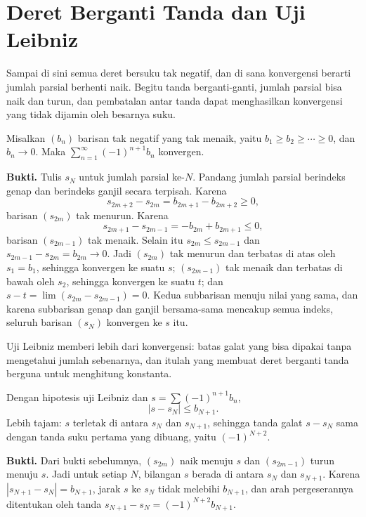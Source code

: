 \section{Deret Berganti Tanda dan Uji Leibniz}

Sampai di sini semua deret bersuku tak negatif, dan di sana konvergensi berarti
jumlah parsial berhenti naik. Begitu tanda berganti-ganti, jumlah parsial bisa naik
dan turun, dan pembatalan antar tanda dapat menghasilkan konvergensi yang tidak
dijamin oleh besarnya suku.

\begin{teorema}
Misalkan $(b_n)$ barisan tak negatif yang tak menaik, yaitu $b_1 \ge b_2 \ge \cdots
\ge 0$, dan $b_n \to 0$. Maka $\sum_{n=1}^{\infty} (-1)^{n+1} b_n$ konvergen.
\end{teorema}

\noindent\textbf{Bukti.} Tulis $s_N$ untuk jumlah parsial ke-$N$. Pandang jumlah parsial berindeks genap dan
berindeks ganjil secara terpisah. Karena
\[
  s_{2m+2} - s_{2m} = b_{2m+1} - b_{2m+2} \ge 0,
\]
barisan $(s_{2m})$ tak menurun. Karena
\[
  s_{2m+1} - s_{2m-1} = -b_{2m} + b_{2m+1} \le 0,
\]
barisan $(s_{2m-1})$ tak menaik. Selain itu $s_{2m} \le s_{2m-1}$ dan
$s_{2m-1} - s_{2m} = b_{2m} \to 0$. Jadi $(s_{2m})$ tak menurun dan terbatas di atas
oleh $s_1 = b_1$, sehingga konvergen ke suatu $s$; $(s_{2m-1})$ tak menaik dan
terbatas di bawah oleh $s_2$, sehingga konvergen ke suatu $t$; dan
$s - t = \lim (s_{2m} - s_{2m-1}) = 0$. Kedua subbarisan menuju nilai yang sama, dan
karena subbarisan genap dan ganjil bersama-sama mencakup semua indeks, seluruh barisan
$(s_N)$ konvergen ke $s$ itu.

Uji Leibniz memberi lebih dari konvergensi: batas galat yang bisa
dipakai tanpa mengetahui jumlah sebenarnya, dan itulah yang membuat deret berganti tanda
berguna untuk menghitung konstanta.

\begin{teorema}
Dengan hipotesis uji Leibniz dan $s = \sum (-1)^{n+1} b_n$,
\[
  \left| s - s_N \right| \le b_{N+1}.
\]
Lebih tajam: $s$ terletak di antara $s_N$ dan $s_{N+1}$, sehingga tanda galat
$s - s_N$ sama dengan tanda suku pertama yang dibuang, yaitu $(-1)^{N+2}$.
\end{teorema}

\noindent\textbf{Bukti.} Dari bukti sebelumnya, $(s_{2m})$ naik menuju $s$ dan $(s_{2m-1})$ turun menuju $s$.
Jadi untuk setiap $N$, bilangan $s$ berada di antara $s_N$ dan $s_{N+1}$. Karena
$|s_{N+1} - s_N| = b_{N+1}$, jarak $s$ ke $s_N$ tidak melebihi $b_{N+1}$, dan arah
pergeserannya ditentukan oleh tanda $s_{N+1} - s_N = (-1)^{N+2} b_{N+1}$.

